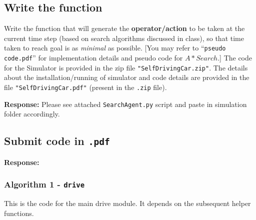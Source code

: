 \documentclass[12pt, letterpaper]{article}
\newcommand{\mybox}[1]{\par\noindent\colorbox{shadecolor}
{\parbox{\dimexpr\textwidth-2\fboxsep\relax}{#1}}}
\begin{document}
\subsection{Write the function}
\mybox{Write the function that will generate the \textbf{operator/action} to be taken at the current time step (based on search algorithms discussed in class), so that time taken to reach goal is as \textit{minimal} as possible. 
[You may refer to “\texttt{pseudo code.pdf}” for implementation details and pseudo code for $A* Search$.]
The code for the Simulator is provided in the zip file \texttt{"SelfDrivingCar.zip"}. The details about the
installation/running of simulator and code details are provided in the file \texttt{"SelfDrivingCar.pdf"}
(present in the \texttt{.zip} file).}

\textbf{Response:} Please see attached \texttt{SearchAgent.py} script and paste in simulation folder accordingly.

\subsection{Submit code in \texttt{.pdf}}

\textbf{Response:}

\subsubsection{Algorithm 1 - \texttt{drive}}

This is the code for the main drive module. It depends on the subsequent helper functions.
\end{document}
